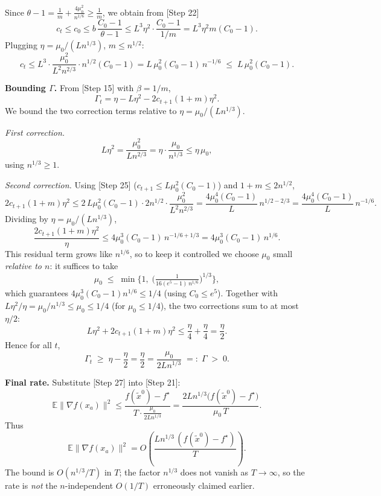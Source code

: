 \documentclass[11pt]{article}
\begin{document}
Since $\theta-1 = \tfrac1m + \tfrac{4\mu_0^2}{n^{1/6}} \ge \tfrac1m$, we obtain from
[Step 22]
\[
c_t \le c_0 \le b\,\frac{C_0 - 1}{\theta - 1}
\le L^3\eta^2 \cdot \frac{C_0-1}{1/m} = L^3\eta^2 m (C_0-1).
\tag*{[Step 24]}
\]
Plugging $\eta=\mu_0/(Ln^{1/3})$, $m\le n^{1/2}$:
\[
c_t \le L^3 \cdot \frac{\mu_0^2}{L^2 n^{2/3}} \cdot n^{1/2}(C_0-1)
= L\,\mu_0^2 (C_0-1)\, n^{-1/6}\;\le\; L\,\mu_0^2(C_0-1).
\tag*{[Step 25]}
\]

\textbf{Bounding $\Gamma$.}
From [Step 15] with $\beta=1/m$,
\[
\Gamma_t = \eta - L\eta^2 - 2c_{t+1}(1+m)\eta^2.
\tag*{[Step 26]}
\]
We bound the two correction terms relative to $\eta = \mu_0/(L n^{1/3})$.

\emph{First correction.}
\[
L\eta^2 = \frac{\mu_0^2}{L n^{2/3}}
= \eta\cdot \frac{\mu_0}{n^{1/3}}
\le \eta\,\mu_0 ,
\]
using $n^{1/3}\ge 1$.

\emph{Second correction.} Using [Step 25] ($c_{t+1}\le L\mu_0^2(C_0-1)$) and
$1+m\le 2n^{1/2}$,
\[
2c_{t+1}(1+m)\eta^2
\le 2\,L\mu_0^2(C_0-1)\cdot 2n^{1/2}\cdot \frac{\mu_0^2}{L^2 n^{2/3}}
= \frac{4\mu_0^4(C_0-1)}{L}\, n^{1/2-2/3}
= \frac{4\mu_0^4(C_0-1)}{L}\, n^{-1/6}.
\]
Dividing by $\eta = \mu_0/(L n^{1/3})$,
\[
\frac{2c_{t+1}(1+m)\eta^2}{\eta}
\le 4\mu_0^3(C_0-1)\, n^{-1/6+1/3}
= 4\mu_0^3(C_0-1)\, n^{1/6}.
\]
This residual term grows like $n^{1/6}$, so to keep it controlled we choose $\mu_0$
small \emph{relative to $n$}: it suffices to take
\[
\mu_0 \;\le\; \min\!\Big\{1,\; \Big(\tfrac{1}{16(e^{5}-1)\, n^{1/6}}\Big)^{1/3}\Big\},
\tag*{[Step 27a]}
\]
which guarantees $4\mu_0^3(C_0-1)n^{1/6}\le 1/4$ (using $C_0\le e^5$). Together with
$L\eta^2/\eta=\mu_0/n^{1/3}\le \mu_0\le 1/4$ (for $\mu_0\le 1/4$), the two corrections
sum to at most $\eta/2$:
\[
L\eta^2 + 2c_{t+1}(1+m)\eta^2 \le \frac{\eta}{4}+\frac{\eta}{4} = \frac{\eta}{2}.
\]
Hence for all $t$,
\[
\Gamma_t \;\ge\; \eta - \frac{\eta}{2} = \frac{\eta}{2}
= \frac{\mu_0}{2Ln^{1/3}} \;=:\; \Gamma \;>\; 0 .
\tag*{[Step 27]}
\]

\textbf{Final rate.}
Substitute [Step 27] into [Step 21]:
\[
\mathbb{E}\|\nabla f(x_a)\|^2
\le \frac{f(\tilde{x}^0)-f^\star}{T\cdot \frac{\mu_0}{2Ln^{1/3}}}
= \frac{2Ln^{1/3}\big(f(\tilde{x}^0)-f^\star\big)}{\mu_0\,T}.
\tag*{[Step 28]}
\]
Thus
\[
\boxed{\;\mathbb{E}\|\nabla f(x_a)\|^2
= O\!\left(\frac{L n^{1/3}\,(f(\tilde{x}^0)-f^\star)}{T}\right).\;}
\]
The bound is $O(n^{1/3}/T)$ in $T$; the factor $n^{1/3}$ does not vanish as $T\to\infty$,
so the rate is \emph{not} the $n$-independent $O(1/T)$ erroneously claimed earlier.
\end{document}
